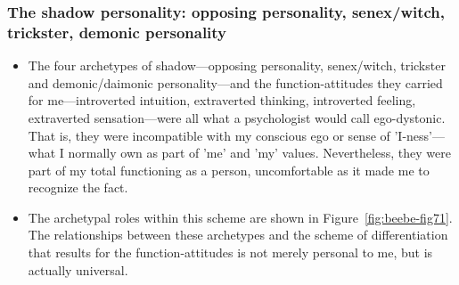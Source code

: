 \subsubsection{The shadow personality: opposing personality, senex/witch, trickster, demonic personality}

\begin{itemize}

\item
The four archetypes of shadow—opposing personality, senex/witch, trickster and
demonic/daimonic personality—and the function-attitudes they carried for
me—introverted intuition, extraverted thinking, introverted feeling,
extraverted sensation—were all what a psychologist would call ego-dystonic.
That is, they were incompatible with my conscious ego or sense of 'I-ness'—
what I normally own as part of 'me' and 'my' values. Nevertheless, they were
part of my total functioning as a person, uncomfortable as it made me to
recognize the fact.

\item The archetypal roles within this scheme are shown in
Figure~\ref{fig:beebe-fig71}.  The relationships between these archetypes and
the scheme of differentiation that results for the function-attitudes is not
merely personal to me, but is actually universal.

\end{itemize}

